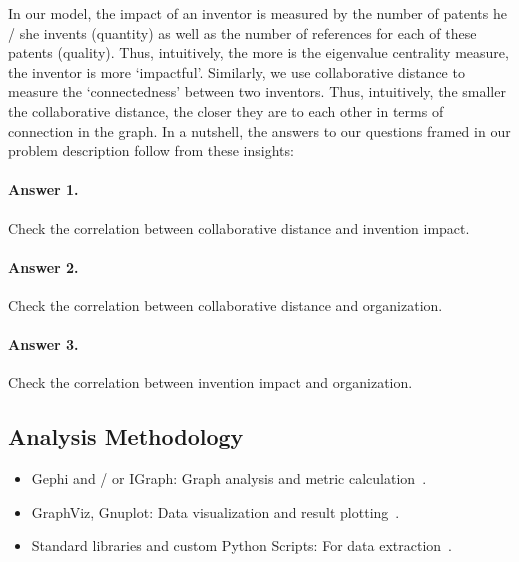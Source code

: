 
In our model, the impact of an inventor is measured by the number of patents
he / she invents (quantity) as well as the number of references for each of
these patents (quality). Thus, intuitively, the more is the eigenvalue
centrality measure, the inventor is more `impactful'. Similarly, we use
collaborative distance to measure the `connectedness' between two inventors.
Thus, intuitively, the smaller the collaborative distance, the closer they are
to each other in terms of connection in the graph.  In a nutshell, the answers
to our questions framed in our problem description follow from these insights:

\paragraph{Answer 1.} Check the correlation between collaborative distance and invention impact. 

\paragraph{Answer 2.} Check the correlation between collaborative distance and organization.

\paragraph{Answer 3.} Check the correlation between invention impact and organization.


\subsection{Analysis Methodology}

	\begin{itemize}
		\item Gephi and / or IGraph: Graph analysis and metric calculation~\cite{gephi, igraph}.

		\item GraphViz, Gnuplot: Data visualization and result plotting~\cite{graphviz, gnuplot}.

		\item Standard libraries and custom Python Scripts: For data extraction~\cite{python}.
	\end{itemize}